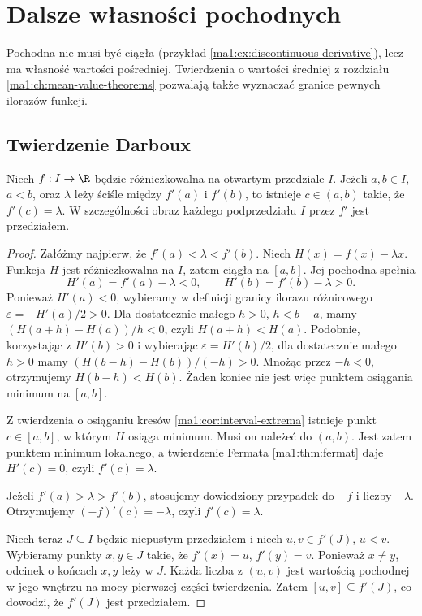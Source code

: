 \chapter{Dalsze własności pochodnych}
\label{ma1:ch:derivative-properties}

Pochodna nie musi być ciągła (przykład \ref{ma1:ex:discontinuous-derivative}), lecz ma własność wartości pośredniej. Twierdzenia o wartości średniej z rozdziału \ref{ma1:ch:mean-value-theorems} pozwalają także wyznaczać granice pewnych ilorazów funkcji.

\section{Twierdzenie Darboux}
\begin{twierdzenie}[Darboux]
\label{ma1:thm:derivative-darboux}
Niech $f:I\to\R$ będzie różniczkowalna na otwartym przedziale $I$. Jeżeli $a,b\in I$, $a<b$, oraz $\lambda$ leży ściśle między $f'(a)$ i $f'(b)$, to istnieje $c\in(a,b)$ takie, że $f'(c)=\lambda$. W szczególności obraz każdego podprzedziału $I$ przez $f'$ jest przedziałem.
\end{twierdzenie}
\begin{proof}
Załóżmy najpierw, że $f'(a)<\lambda<f'(b)$. Niech $H(x)=f(x)-\lambda x$. Funkcja $H$ jest różniczkowalna na $I$, zatem ciągła na $[a,b]$. Jej pochodna spełnia
\[
 H'(a)=f'(a)-\lambda<0,\qquad H'(b)=f'(b)-\lambda>0.
\]
Ponieważ $H'(a)<0$, wybieramy w definicji granicy ilorazu różnicowego $\varepsilon=-H'(a)/2>0$. Dla dostatecznie małego $h>0$, $h<b-a$, mamy $(H(a+h)-H(a))/h<0$, czyli $H(a+h)<H(a)$. Podobnie, korzystając z $H'(b)>0$ i wybierając $\varepsilon=H'(b)/2$, dla dostatecznie małego $h>0$ mamy $(H(b-h)-H(b))/(-h)>0$. Mnożąc przez $-h<0$, otrzymujemy $H(b-h)<H(b)$. Żaden koniec nie jest więc punktem osiągania minimum na $[a,b]$.

Z twierdzenia o osiąganiu kresów \ref{ma1:cor:interval-extrema} istnieje punkt $c\in[a,b]$, w którym $H$ osiąga minimum. Musi on należeć do $(a,b)$. Jest zatem punktem minimum lokalnego, a twierdzenie Fermata \ref{ma1:thm:fermat} daje $H'(c)=0$, czyli $f'(c)=\lambda$.

Jeżeli $f'(a)>\lambda>f'(b)$, stosujemy dowiedziony przypadek do $-f$ i liczby $-\lambda$. Otrzymujemy $(-f)'(c)=-\lambda$, czyli $f'(c)=\lambda$.

Niech teraz $J\subseteq I$ będzie niepustym przedziałem i niech $u,v\in f'(J)$, $u<v$. Wybieramy punkty $x,y\in J$ takie, że $f'(x)=u$, $f'(y)=v$. Ponieważ $x\ne y$, odcinek o końcach $x,y$ leży w $J$. Każda liczba z $(u,v)$ jest wartością pochodnej w jego wnętrzu na mocy pierwszej części twierdzenia. Zatem $[u,v]\subseteq f'(J)$, co dowodzi, że $f'(J)$ jest przedziałem.
\end{proof}

